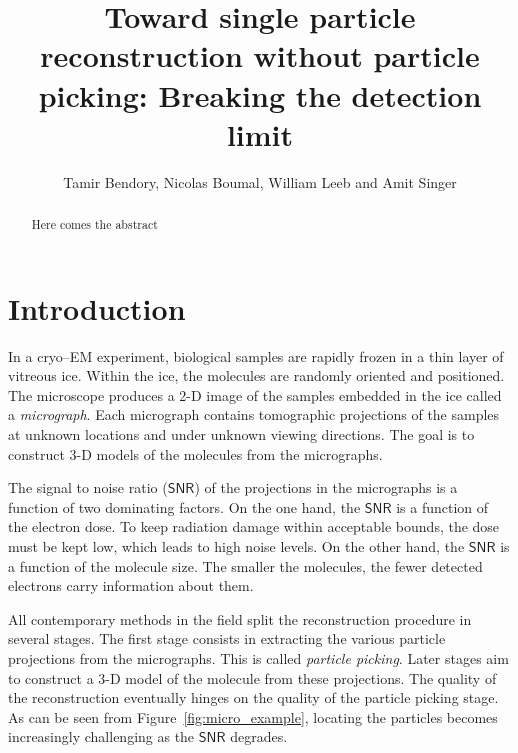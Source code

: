 \documentclass[english,11pt]{article}
\newcommand{\1}{\mathbf{1}}
\newcommand{\TODO}[1]{{\color{red}{[#1]}}}
\numberwithin{equation}{section}
\theoremstyle{plain}
\theoremstyle{definition}
\theoremstyle{remark}
\theoremstyle{plain}
\theoremstyle{remark}
\theoremstyle{plain}
\theoremstyle{plain}
\newcommand{\SNR}{\ensuremath{\textsf{SNR}}}
\begin{document}
\title{Toward single particle reconstruction without particle picking: Breaking the detection limit}


\author{Tamir Bendory, Nicolas Boumal, William Leeb and Amit Singer}
\maketitle

\begin{abstract}
	Here comes the abstract
\end{abstract}

\section{Introduction}

\TODO{Revise--Cryo--electron microscopy (cryo--EM) is an innovative technology for single particle reconstruction (SPR) of macromolecules.} 
% 
In a cryo--EM experiment, biological samples are rapidly frozen in a thin layer of vitreous ice. Within the ice, the molecules are randomly oriented and positioned. The microscope produces a 2-D image of the samples embedded in the ice called a \emph{micrograph}. Each micrograph contains tomographic projections of the samples at unknown locations and under unknown viewing directions. The goal is to construct 3-D models of the molecules from the micrographs.

The signal to noise ratio ($\SNR$) of the projections in the micrographs is a function of two dominating factors. On the one hand, the $\SNR$ is a function of the electron dose. To keep radiation damage within acceptable bounds, the dose must be kept low, which leads to high noise levels. On the other hand, the $\SNR$ is a function of the molecule size. The smaller the molecules, the fewer detected electrons carry information about them.

All contemporary methods in the field split the reconstruction procedure in several stages.
The first stage consists in extracting the various particle projections from the micrographs. This is called \emph{particle picking}. Later stages aim to construct a 3-D model of the molecule from these projections. The quality of the reconstruction eventually hinges on the quality of the particle picking stage. As can be seen from Figure~\ref{fig:micro_example}, locating the particles becomes increasingly challenging as the $\SNR$ degrades.
\end{document}
